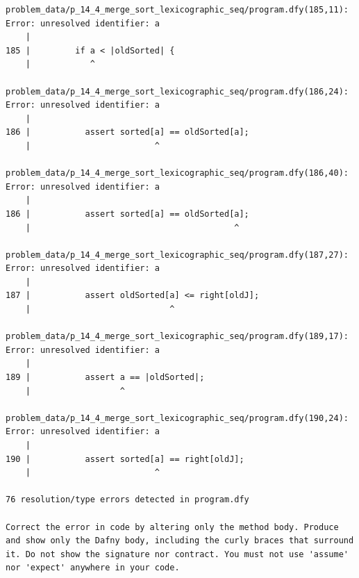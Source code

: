 \documentclass{article}
\begin{document}
\begin{lstlisting}
problem_data/p_14_4_merge_sort_lexicographic_seq/program.dfy(185,11): Error: unresolved identifier: a
    |
185 |         if a < |oldSorted| {
    |            ^

problem_data/p_14_4_merge_sort_lexicographic_seq/program.dfy(186,24): Error: unresolved identifier: a
    |
186 |           assert sorted[a] == oldSorted[a];
    |                         ^

problem_data/p_14_4_merge_sort_lexicographic_seq/program.dfy(186,40): Error: unresolved identifier: a
    |
186 |           assert sorted[a] == oldSorted[a];
    |                                         ^

problem_data/p_14_4_merge_sort_lexicographic_seq/program.dfy(187,27): Error: unresolved identifier: a
    |
187 |           assert oldSorted[a] <= right[oldJ];
    |                            ^

problem_data/p_14_4_merge_sort_lexicographic_seq/program.dfy(189,17): Error: unresolved identifier: a
    |
189 |           assert a == |oldSorted|;
    |                  ^

problem_data/p_14_4_merge_sort_lexicographic_seq/program.dfy(190,24): Error: unresolved identifier: a
    |
190 |           assert sorted[a] == right[oldJ];
    |                         ^

76 resolution/type errors detected in program.dfy

Correct the error in code by altering only the method body. Produce and show only the Dafny body, including the curly braces that surround it. Do not show the signature nor contract. You must not use 'assume' nor 'expect' anywhere in your code.
\end{lstlisting}
\end{document}
